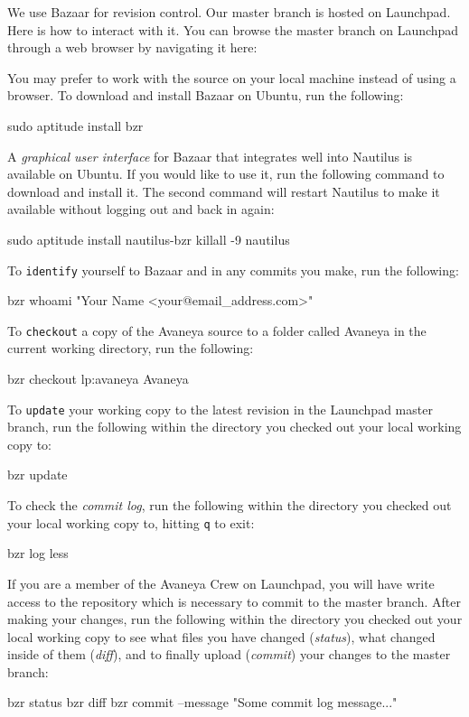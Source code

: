
We use Bazaar for revision control. Our master branch is hosted on Launchpad. Here is how to interact with it. You can browse the master branch on Launchpad through a web browser by navigating it here:


You may prefer to work with the source on your local machine instead of using a browser. To download and install Bazaar on Ubuntu, run the following:

\startCodeExample
\type{$} sudo aptitude install bzr
\stopCodeExample

A {\it graphical user interface} for Bazaar that integrates well into Nautilus is available on Ubuntu. If you would like to use it, run the following command to download and install it. The second command will restart Nautilus to make it available without logging out and back in again:

\startCodeExample
\type{$} sudo aptitude install nautilus-bzr
\type{$} killall -9 nautilus
\stopCodeExample

To {\tt identify} yourself to Bazaar and in any commits you make, run the following:

\startCodeExample
\type{$} bzr whoami "Your Name <your@email_address.com>"
\stopCodeExample

To {\tt checkout} a copy of the Avaneya source to a folder called Avaneya in the current working directory, run the following:

\startCodeExample
\type{$} bzr checkout lp:avaneya Avaneya
\stopCodeExample

To {\tt update} your working copy to the latest revision in the Launchpad master branch, run the following within the directory you checked out your local working copy to:

\startCodeExample
\type{$} bzr update
\stopCodeExample

To check the {\it commit log}, run the following within the directory you checked out your local working copy to, hitting {\tt q} to exit:

\startCodeExample
\type{$} bzr log \type{|} less
\stopCodeExample

If you are a member of the Avaneya Crew on Launchpad, you will have write access to the repository which is necessary to commit to the master branch. After making your changes, run the following within the directory you checked out your local working copy to see what files you have changed ({\it status}), what changed inside of them ({\it diff}), and to finally upload ({\it commit}) your changes to the master branch:

\startCodeExample
\type{$} bzr status
\type{$} bzr diff
\type{$} bzr commit --message "Some commit log message..."
\stopCodeExample

